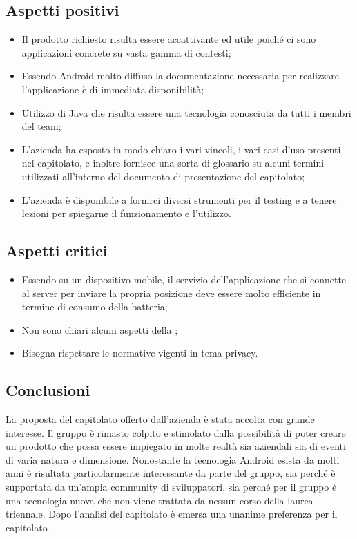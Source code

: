 \subsection{Aspetti positivi}
\begin{itemize}
\item Il prodotto richiesto risulta essere accattivante ed utile poiché ci sono applicazioni concrete su vasta gamma di contesti;
\item Essendo Android molto diffuso la documentazione necessaria per realizzare l'applicazione \`e di immediata disponibilità;
\item Utilizzo di Java che risulta essere una tecnologia conosciuta da tutti i membri del team;
\item L'azienda ha esposto in modo chiaro i vari vincoli, i vari casi d'uso presenti nel capitolato, e inoltre fornisce una sorta di glossario su alcuni termini utilizzati all'interno del documento di presentazione del capitolato;
\item L'azienda \`e disponibile a fornirci diversi strumenti per il testing e a tenere lezioni per spiegarne il funzionamento e l'utilizzo.
\end{itemize}
\subsection{Aspetti critici}
\begin{itemize}
\item Essendo su un dispositivo mobile, il servizio dell'applicazione che si connette al server per inviare la propria posizione deve essere molto efficiente in termine di consumo della batteria;
\item Non sono chiari alcuni aspetti della ;
\item Bisogna rispettare le normative vigenti in tema privacy.
\end{itemize}
\subsection{Conclusioni}
La proposta del capitolato offerto dall'azienda \Proponente{} è stata accolta con grande interesse. Il gruppo è rimasto colpito e stimolato dalla possibilità di poter creare un prodotto che possa essere impiegato in molte realtà sia aziendali sia di eventi di varia natura e dimensione. 
Nonostante la tecnologia Android esista da molti anni è risultata particolarmente interessante da parte del gruppo, sia perché è supportata da un'ampia community di sviluppatori, sia perché per il gruppo è una tecnologia nuova che non viene trattata da nessun corso della laurea triennale. Dopo l'analisi del capitolato è emersa una unanime preferenza per il capitolato \NomeProgetto{}.